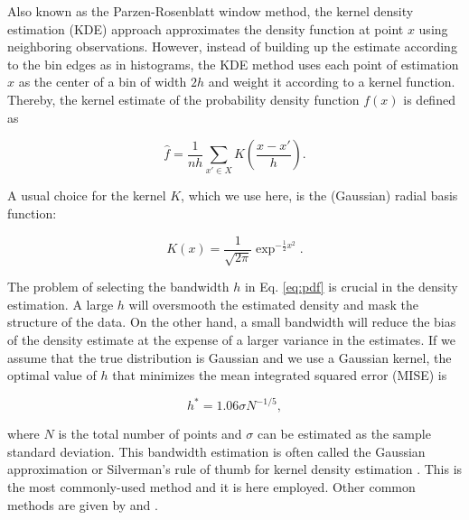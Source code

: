 \documentclass[]{book}
\theoremstyle{definition}
\theoremstyle{definition}
\theoremstyle{definition}
\theoremstyle{remark}
\begin{document}
Also known as the Parzen-Rosenblatt window method, the kernel density
estimation (KDE) approach approximates the density function at point
\(x\) using neighboring observations. However, instead of building up
the estimate according to the bin edges as in histograms, the KDE method
uses each point of estimation \(x\) as the center of a bin of width
\(2h\) and weight it according to a kernel function. Thereby, the kernel
estimate of the probability density function \(f(x)\) is defined as

\begin{equation}
\hat{f} = \frac{1}{nh}\sum_{x' \in X}{K\left(\frac{x - x'}{h}\right)}. 
\label{eq:pdf}
\end{equation}

A usual choice for the kernel \(K\), which we use here, is the
(Gaussian) radial basis function:

\begin{equation}
K(x) = \frac{1}{\sqrt{2\pi}}\exp^{-\frac{1}{2}x^2}. 
\end{equation}

The problem of selecting the bandwidth \(h\) in Eq. \eqref{eq:pdf} is
crucial in the density estimation. A large \(h\) will oversmooth the
estimated density and mask the structure of the data. On the other hand,
a small bandwidth will reduce the bias of the density estimate at the
expense of a larger variance in the estimates. If we assume that the
true distribution is Gaussian and we use a Gaussian kernel, the optimal
value of \(h\) that minimizes the mean integrated squared error (MISE)
is

\begin{equation*}
h^* = 1.06\sigma N^{-1/5},
\end{equation*}

where \(N\) is the total number of points and \(\sigma\) can be
estimated as the sample standard deviation. This bandwidth estimation is
often called the Gaussian approximation or Silverman's rule of thumb for
kernel density estimation \citep{silverman}. This is the most
commonly-used method and it is here employed. Other common methods are
given by \citep{sheather1991reliable} and \citep{scott1992multivariate}.


\end{document}
